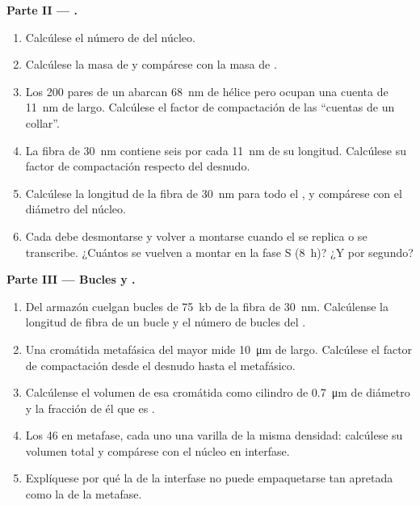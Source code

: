 \begin{problem}
\medskip
\noindent\textbf{Parte II --- .}
\begin{enumerate}[resume]
  \item Calcúlese el número de  del núcleo.
  \item Calcúlese la masa de  y compárese con la masa de .
  \item Los \qty{200}{} pares de un  abarcan \qty{68}{nm} de
        hélice pero ocupan una cuenta de \qty{11}{nm} de largo. Calcúlese
        el factor de compactación de las ``cuentas de un collar''.
  \item La fibra de \qty{30}{nm} contiene seis  por cada
        \qty{11}{nm} de su longitud. Calcúlese su factor de compactación
        respecto del  desnudo.
  \item Calcúlese la longitud de la fibra de \qty{30}{nm} para todo el
        , y compárese con el diámetro del núcleo.
  \item Cada  debe desmontarse y volver a montarse cuando el 
        se replica o se transcribe. ¿Cuántos  se vuelven a
        montar en la fase S (\qty{8}{h})? ¿Y por segundo?
\end{enumerate}

\medskip
\noindent\textbf{Parte III --- Bucles y .}
\begin{enumerate}[resume]
  \item Del armazón cuelgan bucles de \qty{75}{kb} de la fibra de
        \qty{30}{nm}. Calcúlense la longitud de fibra de un bucle y el
        número de bucles del .
  \item Una cromátida metafásica del  mayor mide
        \qty{10}{\micro m} de largo. Calcúlese el factor de compactación
        desde el  desnudo hasta el  metafásico.
  \item Calcúlense el volumen de esa cromátida como cilindro de
        \qty{0.7}{\micro m} de diámetro y la fracción de él que es .
  \item Los 46  en metafase, cada uno una varilla de la misma
        densidad: calcúlese su volumen total y compárese con el núcleo en
        interfase.
  \item Explíquese por qué la  de la interfase no puede
        empaquetarse tan apretada como la de la metafase.
\end{enumerate}


\end{problem}
